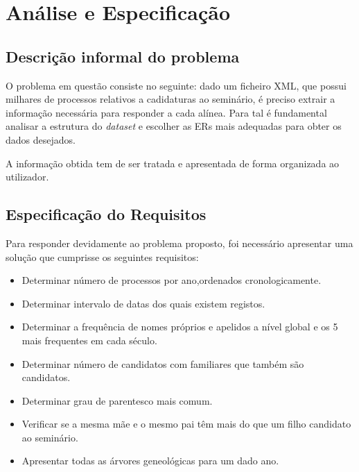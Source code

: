 \documentclass[11pt,a4paper]{report}
\begin{document}
\chapter{Análise e Especificação} \label{chap:analiseEspecificacao}		%


\section{Descrição informal do problema} \label{sec:descricaoProblema} 

	\qquad O problema em questão consiste no seguinte: dado um ficheiro XML, que possui milhares de processos relativos a cadidaturas ao seminário, é preciso extrair a informação necessária para responder a cada alínea. Para tal é fundamental analisar a estrutura do \textit{dataset} e escolher as ERs mais adequadas para obter os dados desejados.\par
	\qquad A informação obtida tem de ser tratada e apresentada de forma organizada ao utilizador.


\section{Especificação do Requisitos}
	
	Para responder devidamente ao problema proposto, foi necessário apresentar uma solução que cumprisse os seguintes requisitos:\\
	\begin{itemize}
		\item Determinar número de processos por ano,ordenados cronologicamente.
		\item Determinar intervalo de datas dos quais existem registos.
		\item Determinar a frequência de nomes próprios e apelidos a nível global e os 5 mais frequentes em cada século.
		\item Determinar número de candidatos com familiares que também são candidatos.
		\item Determinar grau de parentesco mais comum.
		\item Verificar se a mesma mãe e o mesmo pai têm mais do que um filho candidato ao seminário.
		\item Apresentar todas as árvores geneológicas para um dado ano.
		
	\end{itemize}
\end{document}
